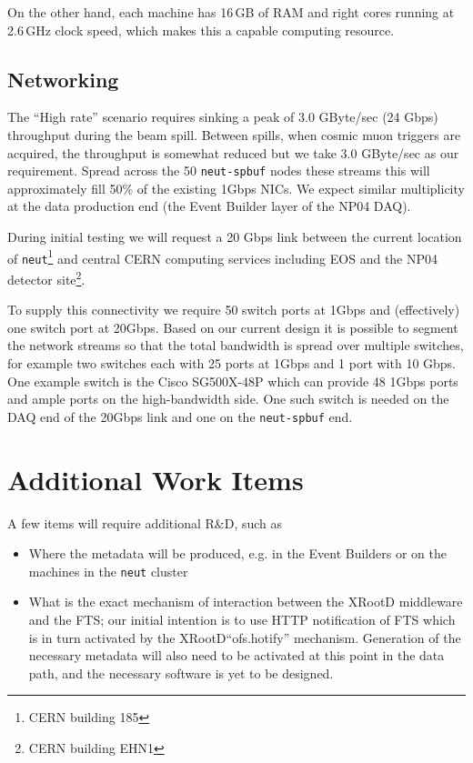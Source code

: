 \documentclass[pdftex,12pt,letter]{article}
\newcommand{\xrd}{XRootD\xspace}
\begin{document}
On the other hand, each machine has 16\,GB of RAM and right cores running at 2.6\,GHz clock speed,
which makes this a capable computing resource.

\subsection{Networking}

The ``High rate'' scenario requires sinking a peak of 3.0 GByte/sec
(24 Gbps) throughput during the beam spill.  Between spills, when
cosmic muon triggers are acquired, the throughput is somewhat reduced
but we take 3.0 GByte/sec as our requirement.  Spread across the 50
\texttt{neut-spbuf} nodes these streams this will approximately fill
50\% of the existing 1Gbps NICs.  We expect similar multiplicity at
the data production end (the Event Builder layer of the NP04 DAQ).

During initial testing we will request a 20 Gbps link between the
current location of \texttt{neut}\footnote{CERN building 185} and
central CERN computing services including EOS and the NP04 detector
site\footnote{CERN building EHN1}.

To supply this connectivity we require 50 switch ports at 1Gbps and
(effectively) one switch port at 20Gbps.  Based on our current design
it is possible to segment the network streams so that the total
bandwidth is spread over multiple switches, for example two switches
each with 25 ports at 1Gbps and 1 port with 10 Gbps.  One example
switch is the Cisco SG500X-48P which can provide 48 1Gbps ports and
ample ports on the high-bandwidth side.  One such switch is needed on
the DAQ end of the 20Gbps link and one on the \texttt{neut-spbuf} end.

\section{Additional Work Items}
A few items will require additional R\&D, such as
\begin{itemize}
\item Where the metadata will be produced, e.g. in the Event Builders or on the machines
in the \texttt{neut} cluster
\item What is the exact mechanism of interaction between the \xrd middleware and the FTS; our initial intention
is to use HTTP notification of FTS which is in turn activated by the \xrd ``ofs.hotify'' mechanism. Generation
of the necessary metadata will also need to be activated at this point in the data path, and the necessary software
is yet to be designed.
\end{itemize}
\end{document}
